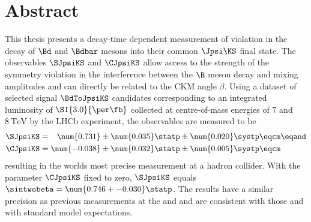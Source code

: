 \clearpage
\thispagestyle{empty}

\vspace{2ex}
\section*{Abstract}
This thesis presents a decay-time dependent measurement of \CP violation in the
decay of $\Bd$ and $\Bdbar$ mesons into their common $\Jpsi\KS$ final state. The
\CP observables $\SJpsiKS$ and $\CJpsiKS$ allow access to the strength of the
symmetry violation in the interference between the $\B$ meson decay and mixing
amplitudes and can directly be related to the \acs{CKM} angle $\beta$. Using a
dataset of selected signal $\BdToJpsiKS$ candidates corresponding to an
integrated luminosity of $\SI{3.0}{\per\fb}$ collected at centre-of-mass
energies of $\num{7}$ and $\SI{8}{\TeV}$ by the \acs{LHCb} experiment, the \CP
observables are measured to be
%
\begin{equation*}
  \begin{split}
    \SJpsiKS &= \phantom{-}\num{0.731} \pm \num{0.035} \statp \pm \num{0.020} \systp \eqcm\eqand \\
    \CJpsiKS &=           \num{-0.038} \pm \num{0.032} \statp \pm \num{0.005} \systp \eqcm
  \end{split}
\end{equation*}
%
resulting in the worlds most precise measurement at a hadron collider. With the
parameter $\CJpsiKS$ fixed to zero, $\SJpsiKS$ equals $\sintwobeta = \num{0.746
+- 0.030}\statp$. The results have a similar precision as previous measurements
at the \BFactories \Babar and \Belle and are consistent with those and with
standard model expectations.


